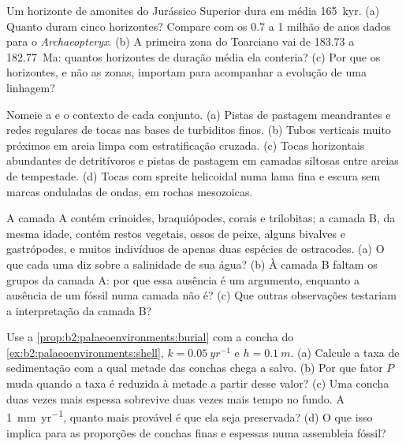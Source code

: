 \begin{exercise}[$\star$]\label{exo:b2:palaeoenvironments:2}
Um horizonte de amonites do Jurássico Superior dura em média \qty{165}{kyr}. (a) Quanto duram cinco horizontes?
Compare com os 0.7 a 1 milhão de anos dados para o \emph{Archaeopteryx}. (b) A primeira
zona do Toarciano vai de 183.73 a \qty{182.77}{Ma}: quantos horizontes de duração média ela conteria?
(c) Por que os horizontes, e não as zonas, importam para acompanhar a evolução de uma linhagem?
\end{exercise}

\begin{exercise}[$\star$]\label{exo:b2:palaeoenvironments:3}
Nomeie a  e o contexto de cada conjunto. (a) Pistas de pastagem meandrantes e redes regulares de
tocas nas bases de turbiditos finos. (b) Tubos verticais muito próximos em areia limpa
com estratificação cruzada. (c) Tocas horizontais abundantes de detritívoros e pistas de pastagem em camadas
siltosas entre areias de tempestade. (d) Tocas com spreite helicoidal numa lama fina e escura sem marcas
onduladas de ondas, em rochas mesozoicas.
\end{exercise}

\begin{exercise}[$\star$]\label{exo:b2:palaeoenvironments:4}
A camada A contém crinoides, braquiópodes, corais e trilobitas; a camada B, da mesma idade, contém restos
vegetais, ossos de peixe, alguns bivalves e gastrópodes, e muitos indivíduos de apenas duas espécies de
ostracodes. (a) O que cada uma diz sobre a salinidade de sua água? (b) À camada B faltam os grupos da
camada A: por que essa ausência é um argumento, enquanto a ausência de um fóssil numa camada não é?
(c) Que outras observações testariam a interpretação da camada B?
\end{exercise}

\begin{exercise}[$\star\star$]\label{exo:b2:palaeoenvironments:5}
Use a \cref{prop:b2:palaeoenvironments:burial} com a concha do
\cref{ex:b2:palaeoenvironments:shell}, $k = \qty{0.05}{yr^{-1}}$ e $h = \qty{0.1}{m}$. (a)
Calcule a taxa de sedimentação com a qual metade das conchas chega a salvo. (b) Por que fator $P$
muda quando a taxa é reduzida à metade a partir desse valor? (c) Uma concha duas vezes mais espessa sobrevive duas vezes mais
tempo no fundo. A \qty{1}{mm.yr^{-1}}, quanto mais provável é que ela seja preservada? (d) O que
isso implica para as proporções de conchas finas e espessas numa assembleia fóssil?
\end{exercise}

